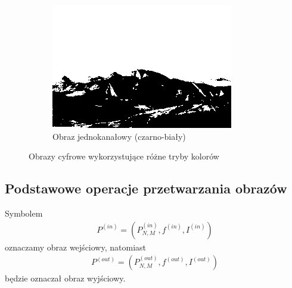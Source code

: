 \begin{figure}
\begin{subfigure}[b]{0.45\textwidth}
    \includegraphics[width=\textwidth]{img/basics-image-binary}
    \caption{Obraz jednokanałowy (czarno-biały)}
    \label{fig:basics_image_binary}
  \end{subfigure}
  \caption{Obrazy cyfrowe wykorzystujące różne tryby kolorów}\label{fig:image_examples}
\end{figure}
\subsection{Podstawowe operacje przetwarzania obrazów}
Symbolem
\begin{gather*}
  P^{(in)} = (P_{N,M}^{(in)}, f^{(in)}, I^{(in)})
\end{gather*}
oznaczamy obraz wejściowy, natomiast
\begin{gather*}
  P^{(out)} = (P_{N,M}^{(out)}, f^{(out)}, I^{(out)})
\end{gather*}
będzie oznaczał obraz wyjściowy.

